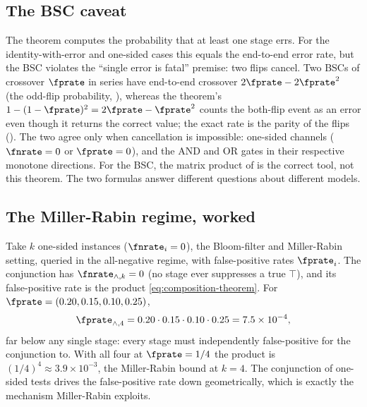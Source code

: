 \subsection*{The BSC caveat}

The theorem computes the probability that at least one stage errs. For the
identity-with-error and one-sided cases this equals the end-to-end error rate,
but the BSC violates the ``single error is fatal'' premise: two flips cancel.
Two BSCs of crossover $\fprate$ in series have end-to-end crossover
$2\fprate - 2\fprate^2$ (the odd-flip probability,
), whereas the theorem's $1 - (1 - \fprate)^2 =
2\fprate - \fprate^2$ counts the both-flip event as an error even though it
returns the correct value; the exact rate is the parity of the flips
(). The two agree only when cancellation is impossible:
one-sided channels ($\fnrate = 0$ or $\fprate = 0$), and the AND and OR gates
in their respective monotone directions. For the BSC, the matrix product of
 is the correct tool, not this theorem. The two
formulas answer different questions about different models.

\subsection*{The Miller-Rabin regime, worked}

Take $k$ one-sided instances ($\fnrate_i = 0$), the Bloom-filter and
Miller-Rabin setting, queried in the all-negative regime, with false-positive
rates $\fprate_i$. The conjunction has $\fnrate_{\wedge,k} = 0$ (no stage ever
suppresses a true $\top$), and its false-positive rate is the product
\eqref{eq:composition-theorem}. For $\fprate = (0.20, 0.15, 0.10, 0.25)$,
\[
  \fprate_{\wedge,4} = 0.20 \cdot 0.15 \cdot 0.10 \cdot 0.25
  = 7.5 \times 10^{-4},
\]
far below any single stage: every stage must independently false-positive for
the conjunction to. With all four at $\fprate = 1/4$ the product is $(1/4)^4
\approx 3.9 \times 10^{-3}$, the Miller-Rabin bound at $k = 4$. The conjunction
of one-sided tests drives the false-positive rate down geometrically, which is
exactly the mechanism Miller-Rabin exploits.

